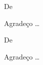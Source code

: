 \begin{agradecimentos}

De \imprimirAutorUm
\newline
\par Agradeço \ldots

\vspace*{\fill}
De \imprimirAutorDois
\newline
\par Agradeço \ldots

\end{agradecimentos}





